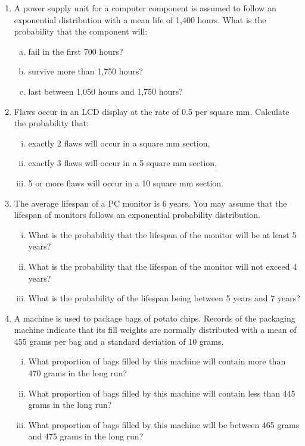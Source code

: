 \documentclass[a4paper,12pt]{article}
\begin{document}
\begin{enumerate}
    \item 
A power supply unit for a computer component is assumed to follow an exponential distribution with a mean life of 1,400 hours.  What is the probability that the component will:
\begin{enumerate}[(a)]
\item fail in the first 700 hours?
\item  survive more than 1,750 hours?
\item  last between 1,050 hours and 1,750 hours?
\end{enumerate}


\item Flaws occur in an LCD display at the rate of 0.5 per square mm.  Calculate the probability that:

\begin{enumerate}[(i)]
\item exactly 2 flaws will occur in a square mm section,
\item  exactly 3 flaws will occur in a 5 square mm section,
\item  5 or more flaws will occur in a 10 square mm section.
\end{enumerate}

\item
The average lifespan of a PC monitor is 6 years. You may assume that the lifespan of monitors follows an exponential probability distribution.
    \begin{enumerate}[(i)]
    \item  What is the probability that the lifespan of the monitor will be at least 5 years?
    \item  What is the probability that the lifespan of the monitor will not exceed 4 years?
    \item  What is the probability of the lifespan being between 5 years and 7 years?
    \end{enumerate}

\item 
A machine is used to package bags of potato chips.  Records of the packaging machine indicate that its fill weights are normally distributed with a mean of 455 grams per bag and a standard deviation of 10 grams.

    \begin{enumerate}[(i)]
    \item  What proportion of bags filled by this machine will contain more than 470 grams in the long run?
    \item What proportion of bags filled by this machine will contain less than 445 grams in the long run?
    \item What proportion of bags filled by this machine will be between 465 grams and 475 grams in the long run?
    \end{enumerate}
    

\end{enumerate}
\end{document}
